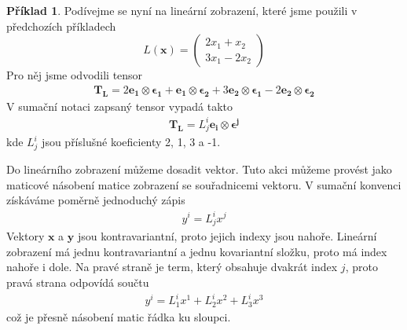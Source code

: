 \documentclass[a5paper,12pt]{amsbook}
\theoremstyle{definition}
\newtheorem{example}{Příklad}[chapter]
\newcommand{\myvec}[1]{\bm{#1}}
\begin{document}
\begin{example}
Podívejme se nyní na lineární zobrazení, které jsme použili v předchozích příkladech
\begin{equation*}
L(\myvec{x}) = \left(
\begin{array}{c}
2 x_1 + x_2 \\
3x_1 - 2 x_2
\end{array}
\right)
\end{equation*}
Pro něj jsme odvodili tensor
\begin{equation*}
\begin{split}
\myvec{T_L} 
= 2\myvec{e_1}\otimes\myvec{\epsilon_1}
+ \myvec{e_1}\otimes\myvec{\epsilon_2}
+ 3\myvec{e_2}\otimes\myvec{\epsilon_1}
- 2\myvec{e_2}\otimes\myvec{\epsilon_2}
\end{split}
\end{equation*}
V sumační notaci zapsaný tensor vypadá takto
\begin{equation*}
\begin{split}
\myvec{T_L} = L^i_j \myvec{e_i}\otimes\myvec{\epsilon^j}
\end{split}
\end{equation*}
kde $L^i_j$ jsou příslušné koeficienty 2, 1, 3 a -1.

Do lineárního zobrazení můžeme dosadit vektor. Tuto akci můžeme provést jako maticové násobení
matice zobrazení se souřadnicemi vektoru. V sumační konvenci získáváme poměrně jednoduchý
zápis
\begin{equation*}
\begin{split}
y^i = L^i_j x^j
\end{split}
\end{equation*}
Vektory $\myvec{x}$ a $\myvec{y}$ jsou kontravariantní, proto jejich indexy jsou nahoře. Lineární
zobrazení má jednu kontravariantní a jednu kovariantní složku, proto má index nahoře i dole. Na pravé
straně je term, který obsahuje dvakrát index $j$, proto pravá strana odpovídá součtu
\begin{equation*}
\begin{split}
y^i = L^i_1 x^1 + L^i_2 x^2 + L^i_3 x^3
\end{split}
\end{equation*}
což je přesně násobení matic řádka ku sloupci.
\end{example}
\end{document}

